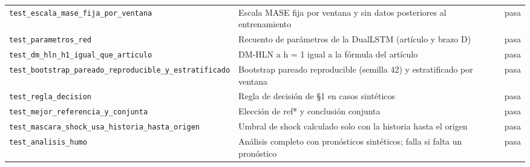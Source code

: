 \begin{tabular}{p{5.2cm}p{8cm}l}
\texttt{test\_escala\_mase\_fija\_por\_ventana} & Escala MASE fija por ventana y sin datos posteriores al entrenamiento & pasa \\
\texttt{test\_parametros\_red} & Recuento de parámetros de la DualLSTM (artículo y brazo D) & pasa \\
\texttt{test\_dm\_hln\_h1\_igual\_que\_articulo} & DM-HLN a h = 1 igual a la fórmula del artículo & pasa \\
\texttt{test\_bootstrap\_pareado\_reproducible\_y\_estratificado} & Bootstrap pareado reproducible (semilla 42) y estratificado por ventana & pasa \\
\texttt{test\_regla\_decision} & Regla de decisión de §1 en casos sintéticos & pasa \\
\texttt{test\_mejor\_referencia\_y\_conjunta} & Elección de ref* y conclusión conjunta & pasa \\
\texttt{test\_mascara\_shock\_usa\_historia\_hasta\_origen} & Umbral de shock calculado solo con la historia hasta el origen & pasa \\
\texttt{test\_analisis\_humo} & Análisis completo con pronósticos sintéticos; falla si falta un pronóstico & pasa \\
\bottomrule
\end{tabular}

